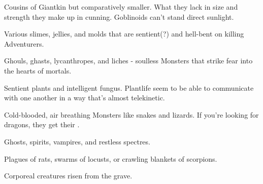 
Cousins of Giantkin but comparatively smaller.  What they lack in size and strength they make up in cunning.  Goblinoids can't stand direct sunlight.



Various slimes, jellies, and molds that are sentient(?) and hell-bent on killing Adventurers.





Ghouls, ghasts, lycanthropes, and liches - soulless Monsters that strike fear into the hearts of mortals.




Sentient plants and intelligent fungus.   Plantlife seem to be able to communicate with one another in a way that's almost telekinetic.




Cold-blooded, air breathing Monsters like snakes and lizards.  If you're looking for dragons, they get their .




Ghosts, spirits, vampires, and restless spectres.  

\cbreak


Plagues of rats, swarms of locusts, or crawling blankets of scorpions.





Corporeal creatures risen from the grave.  




